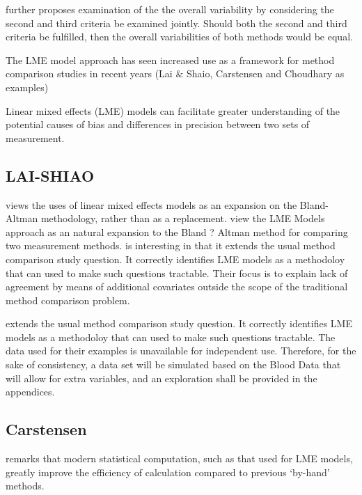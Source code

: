 \documentclass[12pt, a4paper]{report}
\theoremstyle{plain}
\theoremstyle{definition}
\theoremstyle{remark}
\begin{document}
\citet{ARoy2009} further proposes examination of the the overall variability by considering the second and third criteria be examined jointly. Should both the second and third criteria be fulfilled, then the overall variabilities of both methods would be equal.



The LME model approach has seen increased use as a framework for method comparison studies in recent years (Lai $\&$ Shaio, Carstensen and Choudhary as examples)


Linear mixed effects (LME) models can facilitate greater
understanding of the potential causes of bias and differences in
precision between two sets of measurement. 

\subsection*{LAI-SHIAO}
\citet{LaiShiao} views
the uses of linear mixed effects models as an expansion on the
Bland-Altman methodology, rather than as a replacement.\citet{LaiShiao} view the LME Models approach as an natural expansion to the Bland ? Altman method for comparing two measurement methods. \citet{LaiShiao} is interesting in that it extends the usual method comparison study question. It correctly identifies LME models as a methodoloy that can used to make such questions tractable. Their focus is to explain lack of agreement by means of additional covariates outside the scope of the traditional method comparison problem. 	

\citet{LaiShiao} extends the usual method comparison study question. It correctly identifies LME models as a methodoloy that can used to make such questions tractable. The data used for their examples is unavailable for independent use. Therefore, for the sake of consistency, a data set will be simulated based on the Blood Data that will allow for extra variables, and an exploration shall be provided in the appendices.
\subsection*{Carstensen}
\citet{BXC2008} remarks that modern statistical computation, such as that used for LME models, greatly improve the efficiency of
calculation compared to previous `by-hand' methods.
\end{document}
